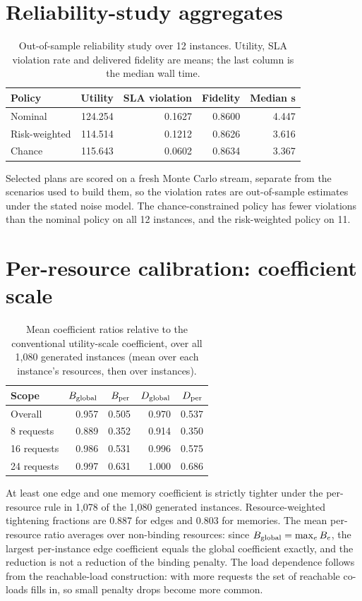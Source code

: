 \documentclass[pdflatex,sn-nature]{sn-jnl}
\begin{document}
\section{Reliability-study aggregates}
\begin{table}[h]
\caption{Out-of-sample reliability study over 12 instances. Utility, SLA violation rate and delivered fidelity are means; the last column is the median wall time.}\centering\small
\begin{tabular}{@{}lrrrr@{}}
\toprule
Policy & Utility & SLA violation & Fidelity & Median s\\
\midrule
Nominal & 124.254 & 0.1627 & 0.8600 & 4.447\\
Risk-weighted & 114.514 & 0.1212 & 0.8626 & 3.616\\
Chance & 115.643 & 0.0602 & 0.8634 & 3.367\\
\bottomrule
\end{tabular}
\end{table}
Selected plans are scored on a fresh Monte Carlo stream, separate from the scenarios used to build them, so the violation rates are out-of-sample estimates under the stated noise model. The chance-constrained policy has fewer violations than the nominal policy on all 12 instances, and the risk-weighted policy on 11.

\section{Per-resource calibration: coefficient scale}
\begin{table}[h]
\caption{Mean coefficient ratios relative to the conventional utility-scale coefficient, over all 1,080 generated instances (mean over each instance's resources, then over instances).}\centering\small
\begin{tabular}{@{}lrrrr@{}}
\toprule
Scope & $B_{\rm global}$ & $B_{\rm per}$ & $D_{\rm global}$ & $D_{\rm per}$\\
\midrule
Overall & 0.957 & 0.505 & 0.970 & 0.537\\
8 requests & 0.889 & 0.352 & 0.914 & 0.350\\
16 requests & 0.986 & 0.531 & 0.996 & 0.575\\
24 requests & 0.997 & 0.631 & 1.000 & 0.686\\
\bottomrule
\end{tabular}
\end{table}
At least one edge and one memory coefficient is strictly tighter under the per-resource rule in 1,078 of the 1,080 generated instances. Resource-weighted tightening fractions are 0.887 for edges and 0.803 for memories. The mean per-resource ratio averages over non-binding resources: since $B_{\rm global}=\max_eB_e$, the largest per-instance edge coefficient equals the global coefficient exactly, and the reduction is not a reduction of the binding penalty. The load dependence follows from the reachable-load construction: with more requests the set of reachable co-loads fills in, so small penalty drops become more common.
\end{document}

